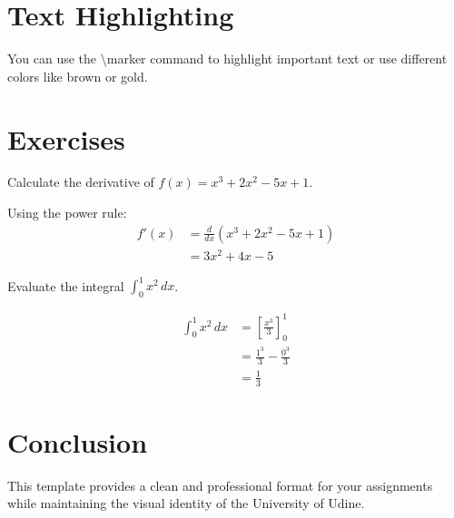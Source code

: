 \documentclass[tikz,12pt,a4paper]{article}
\newcommand{\marker}[2][UniOrange]{\colorbox{#1!30}{#2}}
\theoremstyle{definition}
\begin{document}
\section{Text Highlighting}

You can use the \textbackslash marker command to \marker{highlight important text} or use \marker[UniBlue]{different colors} like \marker[UniBrown]{brown} or \marker[UniGold]{gold}.

\section{Exercises}

\begin{questionbox}[title={Exercise 1}]
Calculate the derivative of $f(x) = x^3 + 2x^2 - 5x + 1$.
\end{questionbox}

\begin{solutionbox}[title={Solution to Exercise 1}]
Using the power rule:
\begin{align}
f'(x) &= \frac{d}{dx}(x^3 + 2x^2 - 5x + 1) \\
      &= 3x^2 + 4x - 5
\end{align}
\end{solutionbox}

\begin{questionbox}[title={Exercise 2}]
Evaluate the integral $\displaystyle\int_0^1 x^2 \, dx$.
\end{questionbox}

\begin{solutionbox}[title={Solution to Exercise 2}]
\begin{align}
\int_0^1 x^2 \, dx &= \left[\frac{x^3}{3}\right]_0^1 \\
                    &= \frac{1^3}{3} - \frac{0^3}{3} \\
                    &= \frac{1}{3}
\end{align}
\end{solutionbox}

\section{Conclusion}

This template provides a clean and professional format for your assignments while maintaining the visual identity of the University of Udine.


\end{document}
